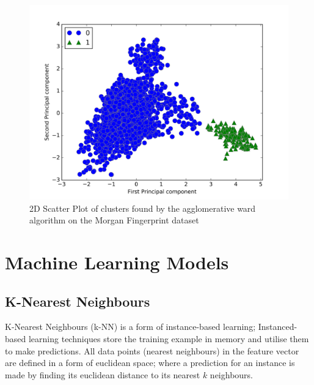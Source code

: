 \documentclass[a4paper,12pt]{report}
\begin{document}
			\begin{figure}[H]
				\centering
				\includegraphics[width=\textwidth,scale=1,totalheight=0.4\textheight]{images/agg_morgan_scatter}
				\caption{2D Scatter Plot of clusters found by the agglomerative ward algorithm on the Morgan Fingerprint dataset}
				\label{fig:agg_morgan_scatter}
			\end{figure}
			



	\section{Machine Learning Models}
		\subsection{K-Nearest Neighbours}
		K-Nearest Neighbours (k-NN) is a form of instance-based learning; Instanced-based learning techniques store the training example in memory and utilise them to make predictions. All data points (nearest neighbours) in the feature vector are defined in a form of euclidean space; where a prediction for an instance is made by finding its euclidean distance to its nearest $k$ neighbours. 
		
\end{document}

